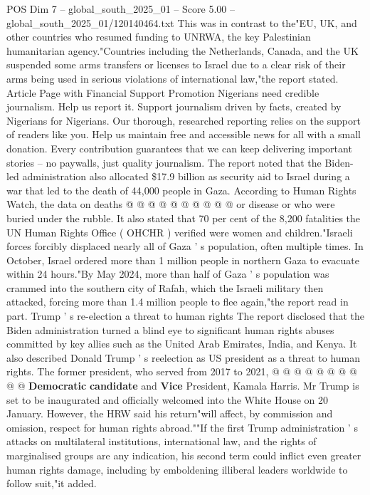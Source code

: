 \begin{textsample}{POS Dim 7 – global\_south\_2025\_01 – Score 5.00 – global\_south\_2025\_01/120140464.txt}  \label{ex:f7_pos_343}
This was in contrast to the"EU, UK, and other countries who resumed funding to UNRWA, the key Palestinian humanitarian agency."Countries including the Netherlands, Canada, and the UK suspended some arms transfers or licenses to Israel due to a clear risk of their arms being used in serious violations of international law,"the report stated.
Article Page with Financial Support Promotion Nigerians need credible journalism.
Help us report it.
Support journalism driven by facts, created by Nigerians for Nigerians.
Our thorough, researched reporting relies on the support of readers like you.
Help us maintain free and accessible news for all with a small donation.
Every contribution guarantees that we can keep delivering important stories -- no paywalls, just quality journalism.
The report noted that the Biden-led administration also allocated \$17.9 billion as security aid to Israel during a war that led to the death of 44,000 people in Gaza.
According to Human Rights Watch, the data on deaths @ @ @ @ @ @ @ @ @ @ or disease or who were buried under the rubble.
It also stated that 70 per cent of the 8,200 fatalities the UN Human Rights Office ( OHCHR ) verified were women and children."Israeli forces forcibly displaced nearly all of Gaza ' s population, often multiple times.
In October, Israel ordered more than 1 million people in northern Gaza to evacuate within 24 hours."By May 2024, more than half of Gaza ' s population was crammed into the southern city of Rafah, which the Israeli military then attacked, forcing more than 1.4 million people to flee again,"the report read in part.
Trump ' s re-election a threat to human rights The report disclosed that the Biden administration turned a blind eye to significant human rights abuses committed by key allies such as the United Arab Emirates, India, and Kenya.
It also described Donald Trump ' s reelection as US president as a threat to human rights.
The former president, who served from 2017 to 2021, @ @ @ @ @ @ @ @ @ @ \textbf{Democratic} \textbf{candidate} and \textbf{Vice} President, Kamala Harris.
Mr Trump is set to be inaugurated and officially welcomed into the White House on 20 January.
However, the HRW said his return"will affect, by commission and omission, respect for human rights abroad.""If the first Trump administration ' s attacks on multilateral institutions, international law, and the rights of marginalised groups are any indication, his second term could inflict even greater human rights damage, including by emboldening illiberal leaders worldwide to follow suit,"it added.

\end{textsample}
